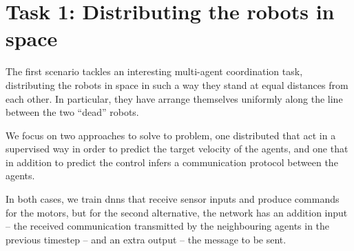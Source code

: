 \section{Task 1: Distributing the robots in space}
\label{sec:task1}

The first scenario tackles an interesting multi-agent coordination task, 
distributing the robots in space in such a way they stand at equal distances 
from each other. In particular, they have arrange themselves uniformly along the 
line between the two ``dead'' robots.

We focus on two approaches to solve to problem, one distributed that act in a 
supervised way in order to predict the target velocity of the agents, and one that 
in addition to predict the control infers a communication protocol between the 
agents. 

In both cases, we train \glspl{dnn} that receive sensor inputs and produce 
commands for the motors, but for the second alternative, the network has an 
addition input – the received communication transmitted by the neighbouring 
agents in the previous timestep – and an extra output – the message to be sent.




